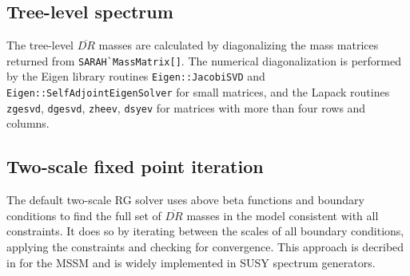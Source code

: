 \documentclass[final,3p,times,pdflatex]{elsarticle}
\newcommand{\code}[1]{\lstinline|#1|}  %
\begin{document}
\subsection{Tree-level spectrum}
The tree-level $\overline{DR}$ masses are calculated by diagonalizing
the mass matrices returned from \code{SARAH`MassMatrix[]}.  The
numerical diagonalization is performed by the Eigen library routines
\code{Eigen::JacobiSVD} and \code{Eigen::SelfAdjointEigenSolver} for
small matrices, and the Lapack routines \code{zgesvd}, \code{dgesvd},
\code{zheev}, \code{dsyev} for matrices with more than four rows and
columns.

\subsection{Two-scale fixed point iteration}
The default two-scale RG solver uses above beta functions and boundary
conditions to find the full set of $\overline{DR}$ masses in the model
consistent with all constraints.  It does so by iterating between the
scales of all boundary conditions, applying the constraints and
checking for convergence.  This approach is decribed in
\cite{Barger:1993gh} for the MSSM and is widely implemented in SUSY
spectrum generators.
\end{document}
